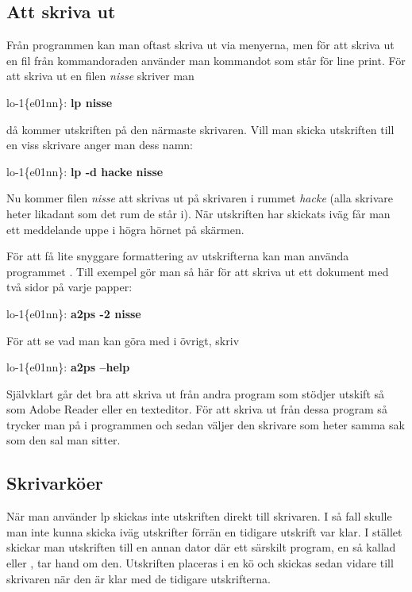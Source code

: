 \documentclass[a4paper,twocolumn]{book}
\begin{document}
\subsection{Att skriva ut}

Från programmen kan man oftast skriva ut via menyerna, men för att skriva ut
en fil från kommandoraden använder man kommandot  som står
för line print. För att skriva ut en filen \emph{nisse} skriver man
\begin{example}
lo-1\{e01nn\}: \textbf{lp nisse}
\end{example}
då kommer utskriften på den närmaste skrivaren. Vill man skicka
utskriften till en viss skrivare anger man dess namn:
\begin{example}
lo-1\{e01nn\}: \textbf{lp -d hacke nisse}
\end{example}
Nu kommer filen \emph{nisse} att skrivas ut på skrivaren i rummet
\emph{hacke} (alla skrivare heter likadant som det rum de står i). När
utskriften har skickats iväg får man ett meddelande uppe
i högra hörnet på skärmen.

För att få lite snyggare formattering av utskrifterna kan man använda
programmet . Till exempel gör man så här för att skriva ut ett
dokument med två sidor på varje papper:
\begin{example}
lo-1\{e01nn\}: \textbf{a2ps -2 nisse}
\end{example}
För att se vad man kan göra med  i övrigt, skriv
\begin{example}
lo-1\{e01nn\}: \textbf{a2ps --help}
\end{example}

Självklart går det bra att skriva ut från andra program som stödjer utskift
så som Adobe Reader eller en texteditor. För att skriva ut från dessa program
så trycker man på  i programmen och sedan väljer den skrivare
som heter samma sak som den sal man sitter.

\subsection{Skrivarköer}

När man använder lp skickas inte utskriften direkt
till skrivaren. I så fall skulle man inte kunna skicka iväg utskrifter
förrän en tidigare utskrift var klar. I stället skickar man utskriften
till en annan dator där ett särskilt program, en så kallad
 eller , tar hand om den.
Utskriften placeras i en kö och skickas sedan vidare till
skrivaren när den är klar med de tidigare utskrifterna.
\end{document}
